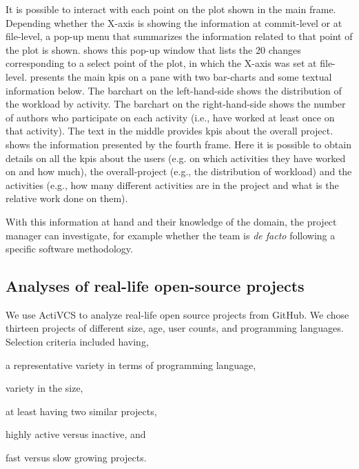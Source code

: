 It is possible to interact with each point on the plot shown in the main frame. Depending whether the X-axis is showing the information at commit-level or at file-level, a pop-up menu that summarizes the information related to that point of the plot is shown.  shows this pop-up window that lists the 20 changes corresponding to a select point of the plot, in which the X-axis was set at file-level. 
 presents the main \glspl{kpi} on a pane with two bar-charts and some textual information below. The barchart on the left-hand-side shows the distribution of the workload by activity. The barchart on the right-hand-side shows the number of authors who participate on each activity (i.e., have worked at least once on that activity). The text in the middle provides \glspl{kpi} about the overall project. 
 shows the information presented by the fourth frame. Here it is possible to obtain details on all the \glspl{kpi} about the users (e.g. on which activities they have worked on and how much), the overall-project (e.g., the distribution of workload) and the activities (e.g., how many different activities are in the project and what is the relative work done on them). 

With this information at hand and their knowledge of the domain, the project manager can investigate, for example whether the team is \textsl{de facto} following a specific software methodology.

\subsection{Analyses of real-life open-source projects}

We use ActiVCS to analyze real-life open source projects from GitHub. 
We chose thirteen projects of different size, age, user counts, and programming languages. Selection criteria included having, 
\begin{inparaenum}[\slshape i)]
\item a representative variety in terms of programming language,
\item variety in the size,
\item at least having two similar projects,
\item highly active versus inactive, and
\item fast versus slow growing projects.
\end{inparaenum}
 

